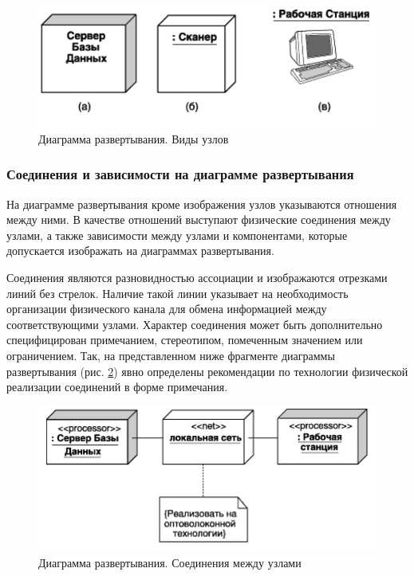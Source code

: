 \documentclass[a4paper,12pt]{extreport}
\begin{document}
\begin{figure}[h!]
	\centering
	\includegraphics[width=0.5\linewidth]{images/deployementnodes}
	\caption{Диаграмма развертывания. Виды узлов}
	\label{fig:deployementnodes}
\end{figure}


\subsubsection*{Соединения и зависимости на диаграмме развертывания}

На диаграмме развертывания кроме изображения узлов указываются отношения между ними. В качестве отношений выступают физические соединения между узлами, а также зависимости между узлами и компонентами, которые допускается изображать на диаграммах развертывания.

Соединения являются разновидностью ассоциации и изображаются отрезками линий без стрелок. Наличие такой линии указывает на необходимость организации физического канала для обмена информацией между соответствующими узлами. Характер соединения может быть дополнительно специфицирован примечанием, стереотипом, помеченным значением или ограничением. Так, на представленном ниже фрагменте диаграммы развертывания (рис. \ref{fig:deployementbuses}) явно определены рекомендации по технологии физической реализации соединений в форме примечания.

\begin{figure}[h!]
	\centering
	\includegraphics[width=0.5\linewidth]{images/deployementbuses}
	\caption{Диаграмма развертывания. Соединения между узлами}
	\label{fig:deployementbuses}
\end{figure}
\end{document}
